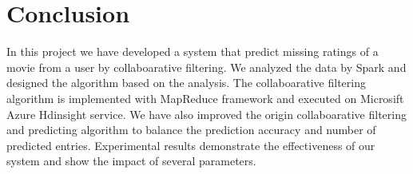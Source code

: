 \documentclass{article}
\begin{document}






\section{Conclusion}
In this project we have developed a system that predict missing
ratings of a movie from a user by collaboarative filtering. We
analyzed the data by Spark and designed the algorithm based on the
analysis. The collaboarative filtering algorithm is implemented with
MapReduce framework and executed on Microsift Azure Hdinsight
service. We have also improved the origin collaboarative filtering and
predicting algorithm to balance the prediction accuracy and number of
predicted entries. Experimental results demonstrate the effectiveness
of our system and show the impact of several parameters.


\end{document}
